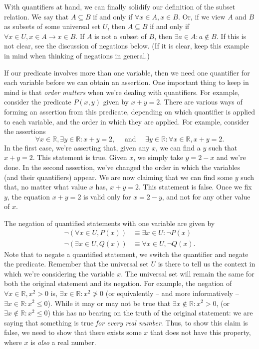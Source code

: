 \documentclass[letterpaper,12pt]{article}
\newcommand{\R}{\mathbb{R}}
\begin{document}
With quantifiers at hand, we can finally solidify our definition of the subset relation. We say that $A\subseteq B$ if and only if $\forall x\in A, x\in B$. Or, if we view $A$ and $B$ as subsets of some universal set $U$, then $A\subseteq B$ if and only if $\forall x\in U, x\in A\to x\in B$. If $A$ is not a subset of $B$, then $\exists a\in A: a\notin B$. If this is not clear, see the discussion of negations below. (If it is clear, keep this example in mind when thinking of negations in general.)

If our predicate involves more than one variable, then we need one quantifier for each variable before we can obtain an assertion. One important thing to keep in mind is that {\em order matters} when we're dealing with quantifiers. For example, consider the predicate $P(x,y)$ given by $x+y=2$. There are various ways of forming an assertion from this predicate, depending on which quantifier is applied to each variable, and the order in which they are applied. For example, consider the assertions
\[
\forall x\in \R, \exists y\in \R :  x+y=2, \quad \text{ and }\quad \exists y\in \R: \forall x\in \R, x+y=2.
\]
In the first case, we're asserting that, given any $x$, we can find a $y$ such that $x+y=2$. This statement is true. Given $x$, we simply take $y=2-x$ and we're done. In the second assertion, we've changed the order in which the variables (and their quantifiers) appear. We are now claiming that we can find some $y$ such that, no matter what value $x$ has, $x+y=2$. This statement is false. Once we fix $y$, the equation $x+y=2$ is valid only for $x=2-y$, and not for any other value of $x$.

The negation of quantified statements with one variable are given by
\begin{align*}
\neg (\forall x\in U, P(x)) & \equiv \exists x\in U: \neg P(x)\\
\neg (\exists x\in U, Q(x)) & \equiv \forall x\in U, \neg Q(x).
\end{align*}
Note that to negate a quantified statement, we switch the quantifier and negate the predicate. Remember that the universal set $U$ is there to tell us the context in which we're considering the variable $x$. The universal set will remain the same for both the original statement and its negation. For example, the negation of $\forall x\in\R, x^2>0$ is, $\exists x\in\R: x^2\ngtr 0$ (or equivalently -- and more informatively -- $\exists x\in\R: x^2\leq 0$). While it may or may not be true that $\exists x\notin\R : x^2>0$, (or $\exists x\notin \R : x^2\leq 0$) this has no bearing on the truth of the original statement: we are saying that something is true {\em for every real number}. Thus, to show this claim is false, we need to show that there exists some $x$ that does not have this property, where $x$ is {\em also} a real number.
\end{document}
